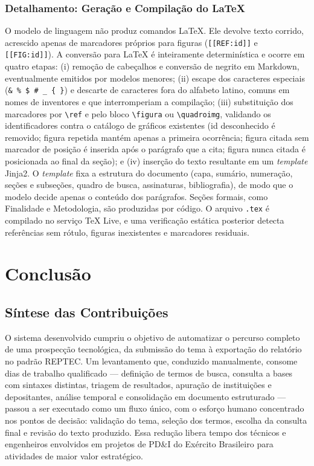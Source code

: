 \documentclass[12pt, a4paper]{article}
\begin{document}
  \subsubsection{Detalhamento: Geração e Compilação do LaTeX}

  O modelo de linguagem não produz comandos \LaTeX{}. Ele devolve texto corrido, acrescido apenas de marcadores próprios para figuras (\texttt{[[REF:id]]} e \texttt{[[FIG:id]]}). A conversão para \LaTeX{} é inteiramente determinística e ocorre em quatro etapas: (i) remoção de cabeçalhos e conversão de negrito em Markdown, eventualmente emitidos por modelos menores; (ii) escape dos caracteres especiais (\texttt{\& \% \$ \# \_ \{ \}}) e descarte de caracteres fora do alfabeto latino, comuns em nomes de inventores e que interromperiam a compilação; (iii) substituição dos marcadores por \verb|\ref| e pelo bloco \verb|\figura| ou \verb|\quadroimg|, validando os identificadores contra o catálogo de gráficos existentes (id desconhecido é removido; figura repetida mantém apenas a primeira ocorrência; figura citada sem marcador de posição é inserida após o parágrafo que a cita; figura nunca citada é posicionada ao final da seção); e (iv) inserção do texto resultante em um \textit{template} Jinja2. O \textit{template} fixa a estrutura do documento (capa, sumário, numeração, seções e subseções, quadro de busca, assinaturas, bibliografia), de modo que o modelo decide apenas o conteúdo dos parágrafos. Seções formais, como Finalidade e Metodologia, são produzidas por código. O arquivo \texttt{.tex} é compilado no serviço TeX Live, e uma verificação estática posterior detecta referências sem rótulo, figuras inexistentes e marcadores residuais.

\section{Conclusão}

  \subsection{Síntese das Contribuições}

  O sistema desenvolvido cumpriu o objetivo de automatizar o percurso completo
de uma prospecção tecnológica, da submissão do tema à exportação do relatório
no padrão REPTEC. Um levantamento que, conduzido manualmente, consome dias de
trabalho qualificado --- definição de termos de busca, consulta a bases com
sintaxes distintas, triagem de resultados, apuração de instituições e
depositantes, análise temporal e consolidação em documento estruturado
\cite{porter2004, mayerhoff2008} --- passou a ser executado como um fluxo
único, com o esforço humano concentrado nos pontos de decisão: validação do
tema, seleção dos termos, escolha da consulta final e revisão do texto
produzido. Essa redução libera tempo dos técnicos e engenheiros envolvidos em
projetos de PD\&I do Exército Brasileiro para atividades de maior valor
estratégico.
\end{document}
